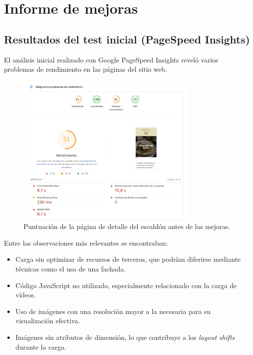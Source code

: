 \documentclass{article}
\begin{document}
\section{Informe de mejoras}\label{sec:informe-de-mejoras}

\subsection{Resultados del test inicial (PageSpeed Insights)}\label{subsec:resultados-del-test-inicial}

El análisis inicial realizado con Google PageSpeed Insights reveló varios problemas de rendimiento en las páginas del sitio web.

\begin{figure}[h!]
    \centering
    \includegraphics[width=0.8\textwidth]{./img/p3/escaldon-performance-before}
    \caption{Puntuación de la página de detalle del escaldón antes de las mejoras.}
    \label{fig:escaldon-performance-before}
\end{figure}

Entre las observaciones más relevantes se encontraban:

\begin{itemize}
    \item Carga sin optimizar de recursos de terceros, que podrían diferirse mediante técnicas como el uso de una fachada.
    \item Código JavaScript no utilizado, especialmente relacionado con la carga de vídeos.
    \item Uso de imágenes con una resolución mayor a la necesaria para su visualización efectiva.
    \item Imágenes sin atributos de dimensión, lo que contribuye a los \textit{layout shifts} durante la carga.
\end{itemize}
\end{document}
